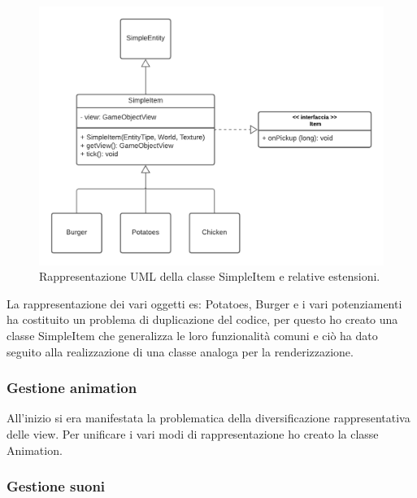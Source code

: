 \documentclass[a4paper,12pt]{report}
\begin{document}
\begin{figure}[H]
\centering{}
\includegraphics[scale=0.75] {img/simple-item.png}
\caption{Rappresentazione UML della classe SimpleItem e relative estensioni.}
\label{img:simple-item}
\end{figure}

La rappresentazione dei vari oggetti es: Potatoes, Burger e i  vari potenziamenti ha costituito un problema di duplicazione del codice, per questo ho creato una classe SimpleItem che generalizza le loro funzionalità comuni e ciò  ha dato seguito alla realizzazione di una classe analoga per la renderizzazione.

\subsubsection{Gestione animation}

All'inizio si era manifestata la problematica della diversificazione rappresentativa delle view. Per unificare i vari modi di rappresentazione ho creato la classe Animation.

\subsubsection{Gestione suoni}
\end{document}
